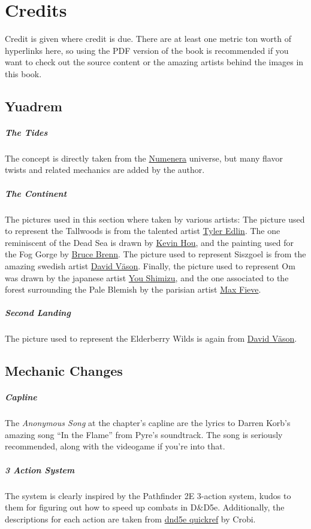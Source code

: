\section{Credits}

Credit is given where credit is due.
There are at least one metric ton worth of hyperlinks here, so using the PDF version of the book is recommended if you want to check out the source content or the amazing artists behind the images in this book.

\subsection*{Yuadrem}
\subparagraph{The Tides} The concept is directly taken from the \href{http://numenera.com/}{Numenera} universe, but many flavor twists and related mechanics are added by the author.

\subparagraph{The Continent} The pictures used in this section where taken by various artists:
The picture used to represent the Tallwoods is from the talented artist \href{https://www.artstation.com/tyleredlinart}{Tyler Edlin}.
The one reminiscent of the Dead Sea is drawn by \href{https://www.artstation.com/knightblur}{Kevin Hou}, and the painting used for the Fog Gorge by \href{https://www.artstation.com/brucebrenn}{Bruce Brenn}.
The picture used to represent Siszgoel is from the amazing swedish artist \href{https://www.artstation.com/davidvason}{David V\"ason}.
Finally, the picture used to represent Om was drawn by the japanese artist \href{https://www.pixiv.net/en/users/2830609}{You Shimizu}, and the one associated to the forest surrounding the Pale Blemish by the parisian artist \href{https://www.artstation.com/maxfieve}{Max Fieve}.

\subparagraph{Second Landing} The picture used to represent the Elderberry Wilds is again from \href{https://www.artstation.com/davidvason}{David V\"ason}.

\subsection*{Mechanic Changes}
\subparagraph{Capline} The \textit{Anonymous Song} at the chapter's capline are the lyrics to Darren Korb's amazing song ``In the Flame'' from Pyre's soundtrack.
The song is seriously recommended, along with the videogame if you're into that.

\subparagraph{3 Action System} The system is clearly inspired by the Pathfinder 2E 3-action system, kudos to them for figuring out how to speed up combats in D\&D5e.
Additionally, the descriptions for each action are taken from \href{https://crobi.github.io/dnd5e-quickref/}{dnd5e quickref} by Crobi.


